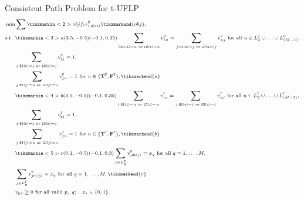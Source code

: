 \documentclass[10pt, xcolor=svgnames]{beamer}
\begin{document}
\begin{frame}[label={sec:orgef78bc0}]{Consistent Path Problem for t-UFLP}
\begin{subequations}
\scriptsize
  \begin{align*}
    \min & \sum \tikzmarkin<2>{obj}f_i v^{\cov}_{i,\hi{i}}\tikzmarkend{obj},\\
    \textrm{s.t. } & \tikzmarkin<3>{a}(3.5,-0.5)(-0.1,0.35)\sum_{i:\hi{i}=u\textrm{ or }\lo{i}=u}v^{\cov}_{iu} = \sum_{j:\hi{u}=j\textrm{ or } \lo{u}=j}v^{\cov}_{uj} \textrm{ for all } u\in L_2^{\cov}\cup\ldots\cup L_{(M-1)}^{\cov},\\
         & \sum_{j:\hi{\ROOT}=j\textrm{ or } \lo{\ROOT}=j}v^{\cov}_{\ROOT{}j} = 1,\\
         & \sum_{j:\hi{j}=u\textrm{ or } \lo{j}=u}v^{\cov}_{ju} = 1 \textrm{ for } u\in \{\T^{\cov},\F^{\cov}\},\tikzmarkend{a}\\
         & \tikzmarkin<4>{b}(3.5,-0.5)(-0.1,0.35)\sum_{i:\hi{i}=u\textrm{ or }\lo{i}=u}v^{\type}_{iu} = \sum_{j:\hi{u}=j\textrm{ or } \lo{u}=j}v^{\type}_{uj} \textrm{ for all } u\in L_2^{\type}\cup\ldots\cup L_{(M-1)}^{\type},\\
         & \sum_{j:\hi{\ROOT}=j\textrm{ or } \lo{\ROOT}=j}v^{\type}_{\ROOT{}j} = 1,\\
         & \sum_{j:\hi{j}=u\textrm{ or } \lo{j}=u}v^{\type}_{ju} = 1 \textrm{ for } u\in \{\T^{\type},\F^{\type}\},\tikzmarkend{b}\\
         &\tikzmarkin<5>{c}(0.1,-0.5)(-0.1,0.3) \sum_{j\in L^{\cov}_q} v^{\cov}_{j\hi{j}} = x_q \textrm{ for all } q=1,\ldots,M,\\
         & \sum_{j\in L^{\type}_q} v^{\type}_{j\hi{j}} = x_q \textrm{ for all } q=1,\ldots,M,\tikzmarkend{c}\\
         & v_{pq}\geq 0 \textrm{ for all valid } p,~q;\quad x_i\in\{0,1\}.
  \end{align*}
\end{subequations}
\end{frame}
\end{document}
